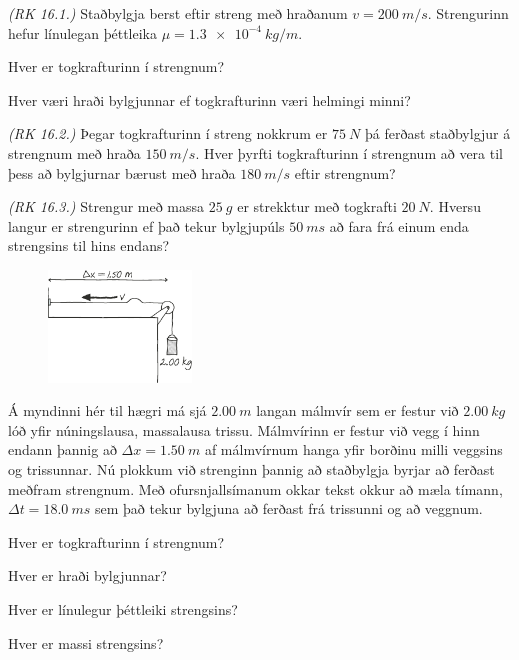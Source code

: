 \ifdefined \wholebook \else\documentclass[oneside]{book}\usepackage{EdlBook}\graphicspath{{figures/}}
\begin{document}
\begin{enumerate}[label = \textbf{Dæmi \thechapter.\arabic*.}]

\item  \textit{(RK 16.1.)} Staðbylgja berst eftir streng með hraðanum $v = \SI{200}{m/s}$. Strengurinn hefur línulegan þéttleika $\mu = \SI{1.3e-4}{kg/m}$. \begin{enumerate*}[label = \textbf{(\alph*)}]
    \item Hver er togkrafturinn í strengnum?
    \item Hver væri hraði bylgjunnar ef togkrafturinn væri helmingi minni?
\end{enumerate*}

\item  \textit{(RK 16.2.)} Þegar togkrafturinn í streng nokkrum er $\SI{75}{N}$ þá ferðast staðbylgjur á strengnum með hraða $\SI{150}{m/s}$. Hver þyrfti togkrafturinn í strengnum að vera til þess að bylgjurnar bærust með hraða $\SI{180}{m/s}$ eftir strengnum?

\item \textit{(RK 16.3.)} Strengur með massa $\SI{25}{g}$ er strekktur með togkrafti $\SI{20}{N}$. Hversu langur er strengurinn ef það tekur bylgjupúls $\SI{50}{ms}$ að fara frá einum enda strengsins til hins endans?

\begin{minipage}{\linewidth}

\begin{figure}
\includegraphics[width = 1.5in]{figures/waveslington.pdf}
\end{figure}

\item Á myndinni hér til hægri má sjá $\SI{2.00}{m}$ langan málmvír sem er festur við $\SI{2.00}{kg}$ lóð yfir núningslausa, massalausa trissu. Málmvírinn er festur við vegg í hinn endann þannig að $\Delta x = \SI{1.50}{m}$ af málmvírnum hanga yfir borðinu milli veggsins og trissunnar. Nú plokkum við strenginn þannig að staðbylgja byrjar að ferðast meðfram strengnum. Með ofursnjallsímanum okkar tekst okkur að mæla tímann, $\Delta t = \SI{18.0}{ms}$ sem það tekur bylgjuna að ferðast frá trissunni og að veggnum. \begin{enumerate*}[label = \textbf{(\alph*)}]
    \item Hver er togkrafturinn í strengnum?
    \item Hver er hraði bylgjunnar?
    \item Hver er línulegur þéttleiki strengsins?
    \item Hver er massi strengsins?
\end{enumerate*}
\end{minipage}


\end{enumerate}
\end{document}
